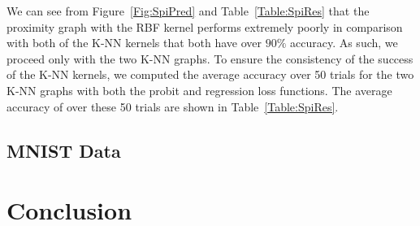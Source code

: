 \documentclass[12pt]{amsart}
\begin{document}
We can see from Figure~\ref{Fig:SpiPred} and Table~\ref{Table:SpiRes} that the proximity graph with the RBF kernel performs extremely poorly in comparison with both of the K-NN kernels that both have over $90\%$ accuracy. As such, we proceed only with the two K-NN graphs. To ensure the consistency of the success of the K-NN kernels, we computed the average accuracy over 50 trials for the two K-NN graphs with both the probit and regression loss functions. The average accuracy of over these 50 trials are shown in Table~\ref{Table:SpiRes}. 

\subsection{MNIST Data}

\section{Conclusion}




\end{document}
